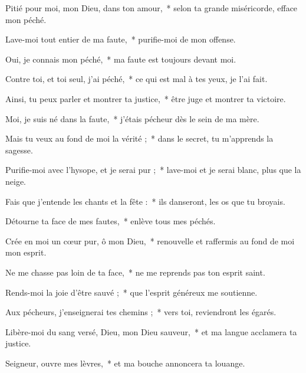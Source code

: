 \item Pitié pour moi, mon Dieu, dans ton amour,~* selon ta grande miséricorde, efface mon péché.

\item Lave-moi tout entier de ma faute,~* purifie-moi de mon offense.

\item Oui, je connais mon péché,~* ma faute est toujours devant moi.

\item Contre toi, et toi seul, j'ai péché,~* ce qui est mal à tes yeux, je l'ai fait.

\item Ainsi, tu peux parler et montrer ta justice,~* être juge et montrer ta victoire.

\item Moi, je suis né dans la faute,~* j'étais pécheur dès le sein de ma mère.

\item Mais tu veux au fond de moi la vérité ;~* dans le secret, tu m'apprends la sagesse.

\item Purifie-moi avec l'hysope, et je serai pur ;~* lave-moi et je serai blanc, plus que la neige.

\item Fais que j'entende les chants et la fête :~* ils danseront, les os que tu broyais.

\item Détourne ta face de mes fautes,~* enlève tous mes péchés.

\item Crée en moi un cœur pur, ô mon Dieu,~* renouvelle et raffermis au fond de moi mon esprit.

\item Ne me chasse pas loin de ta face,~* ne me reprends pas ton esprit saint.

\item Rends-moi la joie d'être sauvé ;~* que l'esprit généreux me soutienne.

\item Aux pécheurs, j'enseignerai tes chemins ;~* vers toi, reviendront les égarés.

\item Libère-moi du sang versé, Dieu, mon Dieu sauveur,~* et ma langue acclamera ta justice.

\item Seigneur, ouvre mes lèvres,~* et ma bouche annoncera ta louange.

